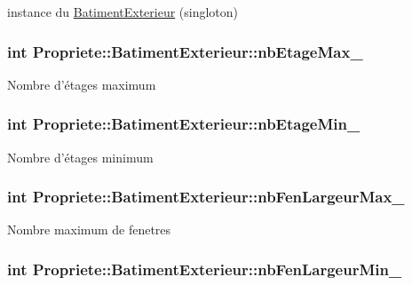 instance du \hyperlink{classPropriete_1_1BatimentExterieur}{Batiment\-Exterieur} (singloton) \hypertarget{classPropriete_1_1BatimentExterieur_ada235dbec45f759dd67709d0971c5007}{
\subsubsection[{nb\-Etage\-Max\-\_\-}]{\setlength{\rightskip}{0pt plus 5cm}int Propriete\-::\-Batiment\-Exterieur\-::nb\-Etage\-Max\-\_\-\hspace{0.3cm}{\ttfamily [private]}}}\label{classPropriete_1_1BatimentExterieur_ada235dbec45f759dd67709d0971c5007}
Nombre d'étages maximum \hypertarget{classPropriete_1_1BatimentExterieur_a62b079703fd94bd1ef19b96b8bf13ae2}{
\subsubsection[{nb\-Etage\-Min\-\_\-}]{\setlength{\rightskip}{0pt plus 5cm}int Propriete\-::\-Batiment\-Exterieur\-::nb\-Etage\-Min\-\_\-\hspace{0.3cm}{\ttfamily [private]}}}\label{classPropriete_1_1BatimentExterieur_a62b079703fd94bd1ef19b96b8bf13ae2}
Nombre d'étages minimum \hypertarget{classPropriete_1_1BatimentExterieur_ad9f633db2a820daa2afb4435929d34cb}{
\subsubsection[{nb\-Fen\-Largeur\-Max\-\_\-}]{\setlength{\rightskip}{0pt plus 5cm}int Propriete\-::\-Batiment\-Exterieur\-::nb\-Fen\-Largeur\-Max\-\_\-\hspace{0.3cm}{\ttfamily [private]}}}\label{classPropriete_1_1BatimentExterieur_ad9f633db2a820daa2afb4435929d34cb}
Nombre maximum de fenetres \hypertarget{classPropriete_1_1BatimentExterieur_aed63340f105b359fd1f51520ce83825f}{
\subsubsection[{nb\-Fen\-Largeur\-Min\-\_\-}]{\setlength{\rightskip}{0pt plus 5cm}int Propriete\-::\-Batiment\-Exterieur\-::nb\-Fen\-Largeur\-Min\-\_\-\hspace{0.3cm}{\ttfamily [private]}}}\label{classPropriete_1_1BatimentExterieur_aed63340f105b359fd1f51520ce83825f}
